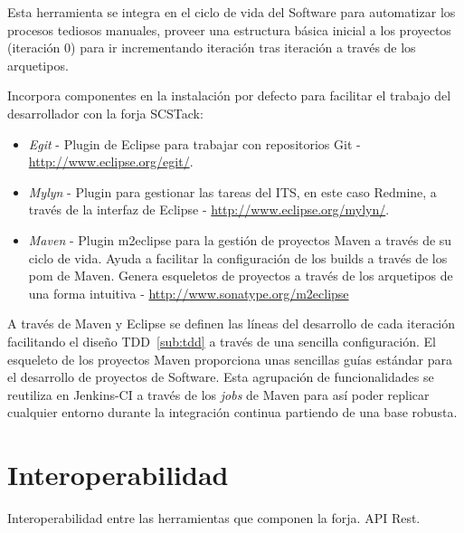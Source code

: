 \par Esta herramienta se integra en el ciclo de vida del Software para automatizar los procesos tediosos manuales, proveer una estructura básica inicial a los proyectos (iteración 0) para ir incrementando iteración tras iteración a través de los arquetipos.

\par Incorpora componentes en la instalación por defecto para facilitar el trabajo del desarrollador con la forja SCSTack:

\begin{itemize}
	\item \emph{Egit} - Plugin de Eclipse para trabajar con repositorios Git - \url{http://www.eclipse.org/egit/}.
	\item \emph{Mylyn} - Plugin para gestionar las tareas del ITS, en este caso Redmine, a través de la interfaz de Eclipse - \url{http://www.eclipse.org/mylyn/}.
	\item \emph{Maven} - Plugin m2eclipse para la gestión de proyectos Maven a través de su ciclo de vida. Ayuda a facilitar la configuración de los builds a través de los pom de Maven. Genera esqueletos de proyectos a través de los arquetipos de una forma intuitiva - \url{http://www.sonatype.org/m2eclipse}
\end{itemize}

\par A través de Maven y Eclipse se definen las líneas del desarrollo de cada iteración facilitando el diseño TDD~\ref{sub:tdd} a través de una sencilla configuración. El esqueleto de los proyectos Maven proporciona unas sencillas guías estándar para el desarrollo de proyectos de Software. Esta agrupación de funcionalidades se reutiliza en Jenkins-CI a través de los \emph{jobs} de Maven para así poder replicar cualquier entorno durante la integración continua partiendo de una base robusta.



\section{Interoperabilidad}
\label{sec:interoperabilidad}

\par Interoperabilidad entre las herramientas que componen la forja. API Rest.

